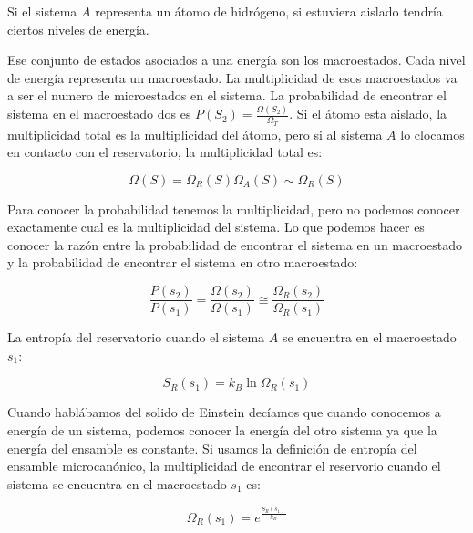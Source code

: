 \documentclass[11pt,fleqn]{book}
\begin{document}
\begin{example}
Si el sistema $A$ representa un átomo de hidrógeno, si estuviera aislado tendría ciertos niveles de energía. 


Ese conjunto de estados asociados a una energía son los macroestados. Cada nivel de energía representa un macroestado. La multiplicidad de esos macroestados va a ser el numero de microestados en el sistema. La probabilidad de encontrar el sistema en el macroestado dos es $P(S_{2})=\frac{\Omega(S_{2})}{\Omega_{T}}$. Si el átomo esta aislado, la multiplicidad total es la multiplicidad del átomo, pero si al sistema $A$ lo clocamos en contacto con el reservatorio, la multiplicidad total es:

\begin{equation*}
    \Omega(S)=\Omega_{R}(S)\Omega_{A}(S)\sim\Omega_{R}(S)
\end{equation*}
\end{example}

Para conocer la probabilidad tenemos la multiplicidad, pero no podemos conocer exactamente cual es la multiplicidad del sistema. Lo que podemos hacer es conocer la razón entre  la probabilidad de encontrar el sistema en un macroestado y la probabilidad de encontrar el sistema en otro macroestado:

\begin{equation}
     \frac{P(s_{2})}{P(s_{1})}=\frac{\Omega(s_{2})}{\Omega(s_{1})}\cong\frac{\Omega_{R}(s_{2})}{\Omega_{R}(s_{1})}
     \label{Eq. 4.1}
\end{equation}

La entropía del reservatorio cuando el sistema $A$ se encuentra en el macroestado $s_{1}$:

\begin{equation*}
    S_{R}(s_{1})=k_{B}\ln{\Omega_{R}(s_{1})}
\end{equation*}

Cuando hablábamos del solido de Einstein decíamos que cuando conocemos a energía de un sistema, podemos conocer la energía del otro sistema ya que la energía del ensamble es constante. Si usamos la definición de entropía del ensamble microcanónico, la multiplicidad de encontrar el reservorio cuando el sistema se encuentra en el macroestado $s_{1}$ es:

\begin{equation*}
    \Omega_{R}(s_{1})=e^{\frac{S_{R}(s_{1})}{k_{B}}}
\end{equation*}
\end{document}
